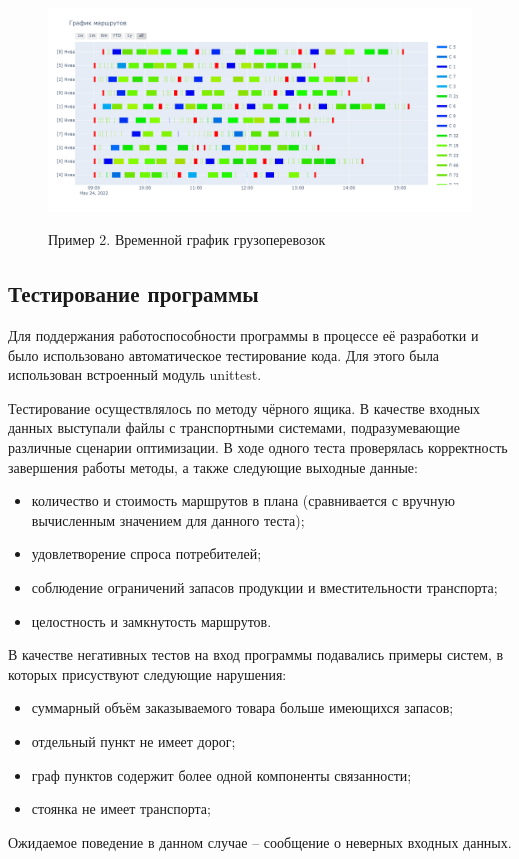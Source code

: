 \begin{figure}[h!]
	\begin{center}
		{\includegraphics[scale=0.38, angle=0, page=1]{img/demo_schedule_2.png}}
		\caption{Пример 2. Временной график грузоперевозок}
		\label{demo:schedule2}
	\end{center}
\end{figure}

\newpage
\subsection{Тестирование программы}
Для поддержания работоспособности программы в процессе её разработки и было использовано автоматическое тестирование кода. Для этого была использован встроенный модуль unittest\cite{libs:unittest}. 

\pagebreak
Тестирование осуществлялось по методу чёрного ящика. В качестве входных данных выступали файлы с транспортными системами, подразумевающие различные сценарии оптимизации. В ходе одного теста проверялась корректность завершения работы методы, а также следующие выходные данные:

\begin{itemize}
	\item количество и стоимость маршрутов в плана (сравнивается с вручную вычисленным значением для данного теста);
	\item удовлетворение спроса потребителей;
	\item соблюдение ограничений запасов продукции и вместительности транспорта;
	\item целостность и замкнутость маршрутов.
\end{itemize}

В качестве негативных тестов на вход программы подавались примеры систем, в которых присуствуют следующие нарушения:
\begin{itemize}
	\item суммарный объём заказываемого товара больше имеющихся запасов;
	\item отдельный пункт не имеет дорог;
	\item граф пунктов содержит более одной компоненты связанности;
	\item стоянка не имеет транспорта;
\end{itemize} 
Ожидаемое поведение в данном случае -- сообщение о неверных входных данных.

